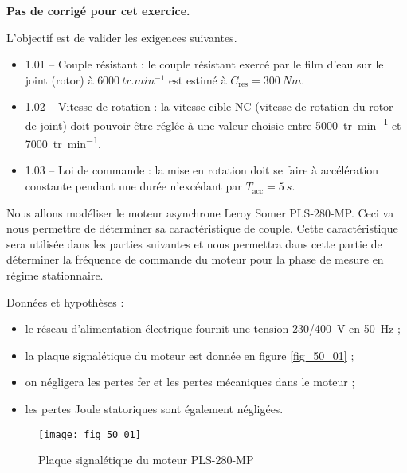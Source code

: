 \normaltrue \difficilefalse \tdifficilefalse
\correctionfalse

\setcounter{question}{0}
\ifcorrection
\else
\textbf{Pas de corrigé pour cet exercice.}
\fi

\ifprof
\else



\begin{obj}
L'objectif est de valider les exigences suivantes.
\begin{itemize}
\item 1.01 -- Couple résistant : le couple résistant exercé par le film d’eau sur le joint (rotor) à $\SI{6000}{tr.min^{-1}}$  est estimé à $C_{\text{res}} = \SI{300}{Nm}$.
\item 1.02 -- Vitesse de rotation : la vitesse cible NC (vitesse de rotation du rotor de joint) doit
pouvoir être réglée à une valeur choisie entre \SI{5000}{tr.min^{-1}} 
et \SI{7000}{tr.min^{-1}}.
\item 1.03 -- Loi de commande : la mise en rotation doit se faire à accélération constante pendant une durée n’excédant par $T_{\text{acc}} = \SI{5}{s}$.
\end{itemize}

Nous allons modéliser le moteur asynchrone Leroy Somer
PLS-280-MP. Ceci va nous permettre de déterminer sa caractéristique de couple. Cette
caractéristique sera utilisée dans les parties suivantes et nous permettra dans cette partie
de déterminer la fréquence de commande du moteur pour la phase de mesure en régime
stationnaire.
\end{obj}


Données et hypothèses :
\begin{itemize}
\item le réseau d’alimentation électrique fournit une tension 230/\SI{400}{V} en \SI{50}{Hz} ;
\item la plaque signalétique du moteur est donnée en figure \autoref{fig_50_01} ;
\item on négligera les pertes fer et les pertes mécaniques dans le moteur ;
\item les pertes Joule statoriques sont également négligées.
\end{itemize}

\begin{figure}[H]
\centering
\texttt{[image: fig\_50\_01]}
\caption{Plaque signalétique du moteur PLS-280-MP \label{fig_50_01}}
\end{figure}
\fi

